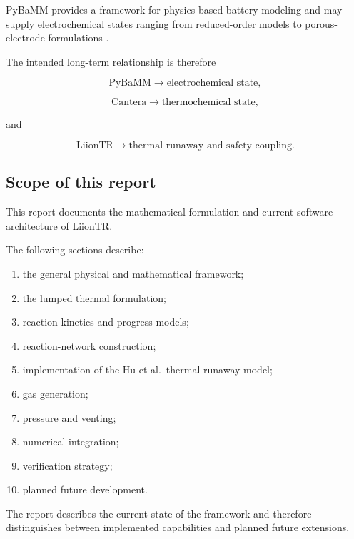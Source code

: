 PyBaMM provides a framework for physics-based battery modeling and may
supply electrochemical states ranging from reduced-order models to
porous-electrode formulations
\parencite{sulzer2021pybamm}.

The intended long-term relationship is therefore

\begin{equation}
    \text{PyBaMM}
    \rightarrow
    \text{electrochemical state},
\end{equation}

\begin{equation}
    \text{Cantera}
    \rightarrow
    \text{thermochemical state},
\end{equation}

and

\begin{equation}
    \text{LiionTR}
    \rightarrow
    \text{thermal runaway and safety coupling}.
\end{equation}


\subsection{Scope of this report}

This report documents the mathematical formulation and current software
architecture of LiionTR.

The following sections describe:

\begin{enumerate}
    \item the general physical and mathematical framework;
    \item the lumped thermal formulation;
    \item reaction kinetics and progress models;
    \item reaction-network construction;
    \item implementation of the Hu et al.\ thermal runaway model;
    \item gas generation;
    \item pressure and venting;
    \item numerical integration;
    \item verification strategy;
    \item planned future development.
\end{enumerate}

The report describes the current state of the framework and therefore
distinguishes between implemented capabilities and planned future
extensions.